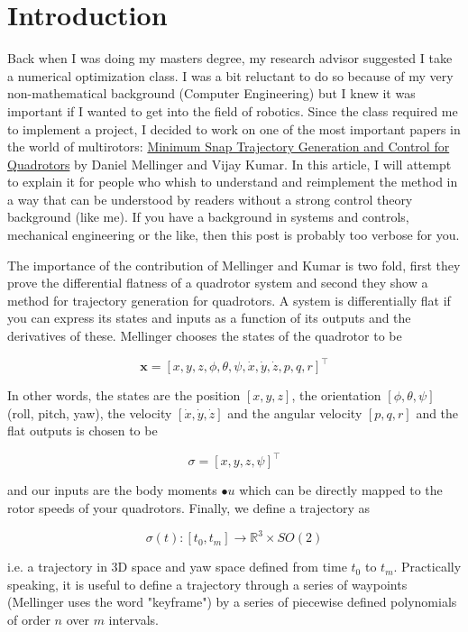 \documentclass{article}
\begin{document}
\section{Introduction}
Back when I was doing my masters degree, my research advisor suggested I take a numerical optimization class. I was a bit reluctant to do so because of my very non-mathematical background (Computer Engineering) but I knew it was important if I wanted to get into the field of robotics. Since the class required me to implement a project, I decided to work on one of the most important papers in the world of multirotors: \href{https://ieeexplore.ieee.org/document/5980409/}{Minimum Snap Trajectory Generation and Control for Quadrotors} by Daniel Mellinger and Vijay Kumar. In this article, I will attempt to explain it for people who whish to understand and reimplement the method in a way that can be understood by readers without a strong control theory background (like me). If you have a background in systems and controls, mechanical engineering or the like, then this post is probably too verbose for you.

The importance of the contribution of Mellinger and Kumar is two fold, first they prove the differential flatness of a quadrotor system and second they show a method for trajectory generation for quadrotors. A system is differentially flat if you can express its states and inputs as a function of its outputs and the derivatives of these. Mellinger chooses the states of the quadrotor to be

\[
	\mathbf{x} = [ x, y, z, \phi, \theta, \psi, \dot{x}, \dot{y}, \dot{z}, p, q, r]^\top
\]

In other words, the states are the position $[x, y, z]$, the orientation $[\phi, \theta, \psi]$ (roll, pitch, yaw), the velocity $[\dot{x}, \dot{y}, \dot{z}]$ and the angular velocity $[p, q, r]$ and the flat outputs is chosen to be

\[
	\sigma = [x, y, z, \psi]^\top
\]

and our inputs are the body moments $\mathbf{•}{u}$ which can be directly mapped to the rotor speeds of your quadrotors. Finally, we define a trajectory as

\[
	\sigma (t) : [t_0, t_m] \rightarrow  \mathbb{R}^3 \times SO(2)
\]

i.e. a trajectory in 3D space and yaw space defined from time $ t_0 $ to $t_m$. Practically speaking, it is useful to define a trajectory through a series of waypoints (Mellinger uses the word "keyframe") by a series of piecewise defined polynomials of order $n$ over $m$ intervals.
\end{document}
